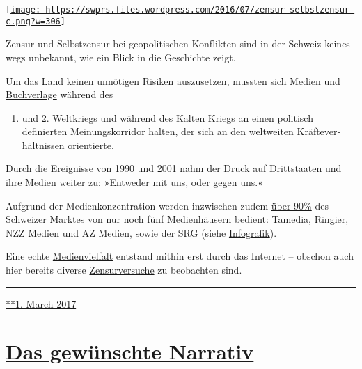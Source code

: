 \href{https://swprs.org/2017/03/01/zensur-in-schweizer-medien/}{\texttt{[image: https://swprs.files.wordpress.com/2016/07/zensur-selbstzensur-c.png?w=306]}}

Zensur und Selbst­zensur bei geo­po­li­tischen Kon­f‌lik­ten sind in der
Schweiz keines­wegs un­be­kannt, wie ein Blick in die Ge­schichte zeigt.

Um das Land keinen un­nöti­gen Ri­si­ken aus­zu­setzen,
\href{http://www.amazon.de/Selbstzensur-schweizerische-Pressepolitik-Zweiten-Weltkrieg/dp/3719304566}{muss­ten}
sich Medien und
\href{https://www.chronos-verlag.ch/node/20528}{Buch­ver­lage} wäh­rend
des

\begin{enumerate}
\def\labelenumi{\arabic{enumi}.}
\tightlist
\item
  und 2. Welt­kriegs und während des
  \href{http://www.swissinfo.ch/ger/das-ende-eines-nationalen-maenner-netzwerks/4205194}{Kal­ten
  Kriegs} an einen po­li­tisch definierten Mei­nungs­korri­dor halten,
  der sich an den welt­wei­ten Kräfte­ver­hält­nissen orientierte.
\end{enumerate}

Durch die Ereignisse von 1990 und 2001 nahm der
\href{https://www.youtube.com/watch?v=a4eGtXFDFJA}{Druck} auf
Drittstaaten und ihre Medien wei­ter zu: »Entweder mit uns, oder gegen
uns.«

Aufgrund der Medien­kon­zen­tration werden in­zwi­schen zudem
\href{https://swprs.files.wordpress.com/2018/03/broschur_jahrbuch_foeg_deutsch_2015.pdf\#page=13}{über
90\%} des Schwei­zer Mark­tes von nur noch fünf Medien­häusern bedient:
Tamedia, Ringier, NZZ Medien und AZ Medien, sowie der SRG (siehe
\href{https://swprs.org/netzwerk-medien-schweiz/}{Info­grafik}).

Eine echte \href{https://swprs.org/medien-navigator/}{Medienvielfalt}
entstand mithin erst durch das Internet -- obschon auch hier bereits
diverse
\href{https://www.heise.de/tp/features/Facebook-Fake-News-und-die-Privatisierung-der-Zensur-3599878.html}{Zensurversuche}
zu beobachten sind.

\begin{center}\rule{0.5\linewidth}{\linethickness}\end{center}

\href{https://swprs.org/2017/03/01/zensur-in-schweizer-medien/}{**1.
March 2017}

\hypertarget{das-gewuxfcnschte-narrativ}{%
\section{\texorpdfstring{\href{https://swprs.org/2017/03/01/das-gewuenschte-narrativ/}{Das
gewünschte
Narrativ}}{Das gewünschte Narrativ}}\label{das-gewuxfcnschte-narrativ}}

